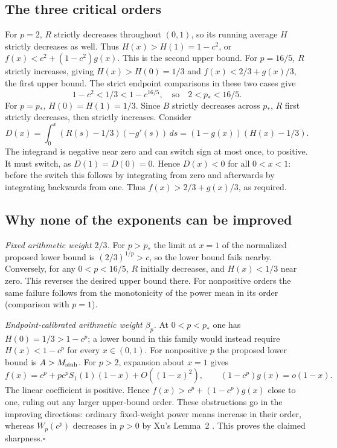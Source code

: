 \documentclass[11pt,a4paper]{article}
\begin{document}
\subsection*{The three critical orders}
For $p=2$, $R$ strictly decreases throughout $(0,1)$, so its running average $H$ strictly decreases as well. Thus $H(x)>H(1)=1-c^2$, or
$f(x)<c^2+(1-c^2)g(x)$. This is the second upper bound.
For $p=16/5$, $R$ strictly increases, giving $H(x)>H(0)=1/3$ and $f(x)<2/3+g(x)/3$, the first upper bound. The strict endpoint comparisons in these two cases give
\[
 1-c^2<1/3<1-c^{16/5},\quad\text{so}\quad 2<p_*<16/5.
\]
For $p=p_*$, $H(0)=H(1)=1/3$. Since $B$ strictly decreases across $p_*$, $R$ first strictly decreases, then strictly increases. Consider
\[
 D(x)=\int_0^x(R(s)-1/3)(-g'(s))\,ds=(1-g(x))(H(x)-1/3).
\]
The integrand is negative near zero and can switch sign at most once, to positive. It must switch, as $D(1)=D(0)=0$. Hence $D(x)<0$ for all $0<x<1$: before the switch this follows by integrating from zero and afterwards by integrating backwards from one. Thus $f(x)>2/3+g(x)/3$, as required.

\subsection*{Why none of the exponents can be improved}
\textit{Fixed arithmetic weight $2/3$.}
For $p>p_*$ the limit at $x=1$ of the normalized proposed lower bound is $(2/3)^{1/p}>c$, so the lower bound fails nearby. Conversely, for any $0<p<16/5$, $R$ initially decreases, and $H(x)<1/3$ near zero. This reverses the desired upper bound there. For nonpositive orders the same failure follows from the monotonicity of the power mean in its order (comparison with $p=1$).

\medskip\noindent
\textit{Endpoint-calibrated arithmetic weight $\beta_p$.}
At $0<p<p_*$ one has $H(0)=1/3>1-c^p$; a lower bound in this family would instead require $H(x)<1-c^p$ for every $x\in(0,1)$. For nonpositive $p$ the proposed lower bound is $A>M_{\sinh}$. For $p>2$, expansion about $x=1$ gives
\[
 f(x)=c^p+p c^p S_1(1)(1-x)+O((1-x)^2),\qquad
 (1-c^p)g(x)=o(1-x).
\]
The linear coefficient is positive. Hence $f(x)>c^p+(1-c^p)g(x)$ close to one, ruling out any larger upper-bound order. These obstructions go in the improving directions: ordinary fixed-weight power means increase in their order, whereas $W_p(c^p)$ decreases in $p>0$ by Xu's Lemma~2 \cite{R23S:xu}. This proves the claimed sharpness.\hfill$\square$
\endgroup


\clearpage
\end{document}
